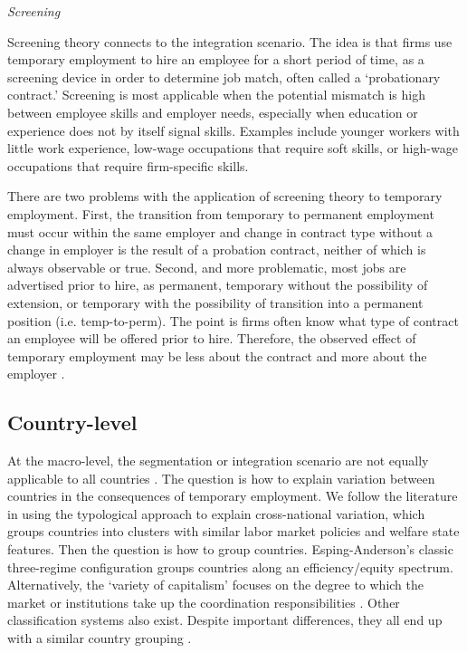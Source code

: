 \documentclass[12pt]{article}
\begin{document}
\emph{Screening}

Screening theory \citep{siglitz_1975} connects to the integration scenario.  The idea is that firms use temporary employment to hire an employee for a short period of time, as a screening device in order to determine job match, often called a `probationary contract.'  Screening is most applicable when the potential mismatch is high between employee skills and employer needs, especially when education or experience does not by itself signal skills.  Examples include younger workers with little work experience, low-wage occupations that require soft skills, or high-wage occupations that require firm-specific skills.

There are two problems with the application of screening theory to temporary employment.  First, the transition from temporary to permanent employment must occur within the same employer and change in contract type without a change in employer is the result of a probation contract, neither of which is always observable or true.  Second, and more problematic, most jobs are advertised prior to hire, as permanent, temporary without the possibility of extension, or temporary with the possibility of transition into a permanent position (i.e. temp-to-perm).  The point is firms often know what type of contract an employee will be offered prior to hire.  Therefore, the observed effect of temporary employment may be less about the contract and more about the employer \citep{andersson_etal_2005}.

\subsection{Country-level}

At the macro-level, the segmentation or integration scenario are not equally applicable to all countries \citep{giesecke_gross_2004}.  The question is how to explain variation between countries in the consequences of temporary employment.  We follow the literature in using the typological approach to explain cross-national variation, which groups countries into clusters with similar labor market policies and welfare state features.  Then the question is how to group countries.  Esping-Anderson's \citeyearpar{esping-andersen_1990} classic three-regime configuration groups countries along an efficiency/equity spectrum.  Alternatively, the `variety of capitalism' focuses on the degree to which the market or institutions take up the coordination responsibilities \citep{hall_soskice_2001}.  Other classification systems also exist.  Despite important differences, they all end up with a similar country grouping \citep{muffels_luijkx_2008}.  
\end{document}
